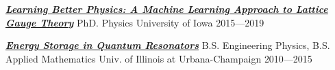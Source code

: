 % 
%
\begin{cventries}

  \cventry%
  {\href{https://ir.uiowa.edu/etd/6944/}{\textbf{\textit{Learning
              Better Physics: A Machine Learning Approach to Lattice Gauge
          Theory}}}}
  {PhD. Physics}
  {University of Iowa}
  {2015---2019}
  {}
  \vspace{-0.5cm}

  \cventry
  {\href{https://aip.scitation.org/doi/10.1063/1.5009698}{\textbf{\textit{Energy Storage in Quantum
      Resonators}}}}
  {B.S. Engineering Physics, B.S. Applied Mathematics}
  {Univ. of Illinois at Urbana-Champaign}
  {2010---2015}
  {}


\end{cventries}
